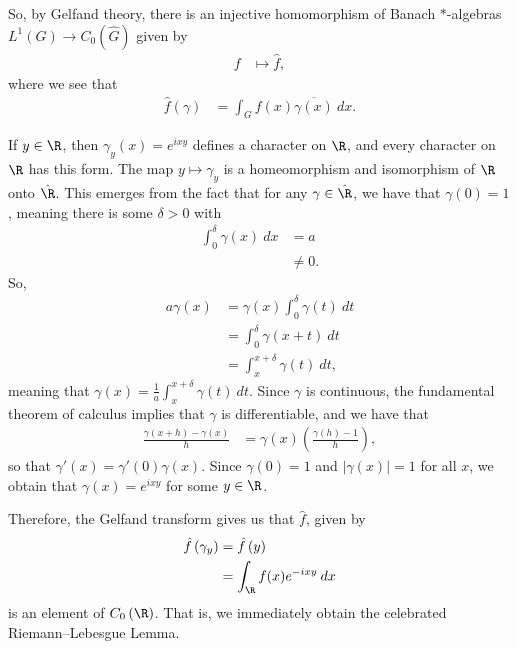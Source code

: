 \documentclass[10pt]{mypackage}
\begin{document}
So, by Gelfand theory, there is an injective homomorphism of Banach $\ast$-algebras $L^1\left( G \right)\to C_0\left( \hat{G} \right)$ given by
\begin{align*}
  f &\mapsto \hat{f},
\end{align*}
where we see that
\begin{align*}
  \hat{f}\left( \gamma \right) &= \int_{G}^{} f(x) \overline{\gamma(x)}\:dx.
\end{align*}
\begin{example}
  If $y\in \R$, then $\gamma_y(x) = e^{ixy}$ defines a character on $\R$, and every character on $\R$ has this form. The map $y\mapsto \gamma_y$ is a homeomorphism and isomorphism of $\R$ onto $\hat{\R}$. This emerges from the fact that for any $\gamma\in \hat{\R}$, we have that $\gamma(0) = 1$, meaning there is some $\delta > 0$ with
  \begin{align*}
    \int_{0}^{\delta} \gamma(x)\:dx &= a\\
                                    &\neq 0.
  \end{align*}
  So,
  \begin{align*}
    a\gamma(x) &= \gamma(x)\int_{0}^{\delta} \gamma(t)\:dt\\
               &= \int_{0}^{\delta} \gamma\left( x+t \right)\:dt\\
               &= \int_{x}^{x+\delta} \gamma(t)\:dt,
  \end{align*}
  meaning that $\gamma(x) = \frac{1}{a} \int_{x}^{x+\delta} \gamma(t)\:dt$. Since $\gamma$ is continuous, the fundamental theorem of calculus implies that $\gamma$ is differentiable, and we have that
  \begin{align*}
    \frac{\gamma\left( x+h \right)-\gamma(x)}{h} &= \gamma(x)\left( \frac{\gamma(h)-1}{h} \right),
  \end{align*}
  so that $\gamma'(x) = \gamma'(0)\gamma(x)$. Since $\gamma(0) = 1$ and $\left\vert \gamma(x) \right\vert = 1$ for all $x$, we obtain that $\gamma(x) = e^{ixy}$ for some $y\in \R$.

  Therefore, the Gelfand transform gives us that $\hat{f}$, given by
  \begin{align*}
    \hat{f}\left( \gamma_y \right) &= \hat{f}\left( y \right)\\
                                   &= \int_{\R}^{} f(x)e^{-ixy}\:dx
  \end{align*}
  is an element of $C_0\left( \R \right)$. That is, we immediately obtain the celebrated Riemann--Lebesgue Lemma.
\end{example}
\end{document}
